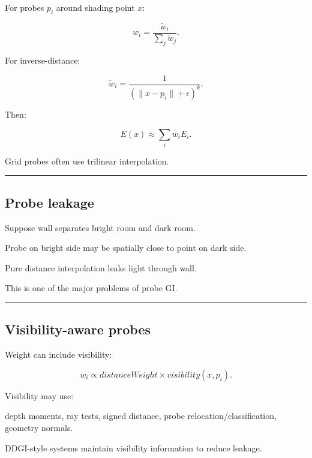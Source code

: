 \hypertarget{04-visual-computing-ii-ch040-probe-interpolation}{}

For probes \(p_i\) around shading point \(x\):

\[
w_i=
\frac{
\tilde w_i
}{
\sum_j\tilde w_j
}.
\]

For inverse-distance:

\[
\tilde w_i=
\frac1{
(\|x-p_i\|+\epsilon)^k
}.
\]

Then:

\[
\boxed{
E(x)
\approx
\sum_iw_iE_i.
}
\]

Grid probes often use trilinear interpolation.

\begin{center}\rule{0.5\linewidth}{0.5pt}\end{center}

\subsection{Probe leakage}\label{04-visual-computing-ii-ch040-probe-leakage}

\hypertarget{04-visual-computing-ii-ch040-probe-leakage}{}

Suppose wall separates bright room and dark room.

Probe on bright side may be spatially close to point on dark side.

Pure distance interpolation leaks light through wall.

This is one of the major problems of probe GI.

\begin{center}\rule{0.5\linewidth}{0.5pt}\end{center}

\subsection{Visibility-aware probes}\label{04-visual-computing-ii-ch040-visibility-aware-probes}

\hypertarget{04-visual-computing-ii-ch040-visibility-aware-probes}{}

Weight can include visibility:

\[
w_i
\propto
distanceWeight
\times
visibility(x,p_i).
\]

Visibility may use:

depth moments, ray tests, signed distance, probe relocation/classification, geometry normals.

DDGI-style systems maintain visibility information to reduce leakage.

